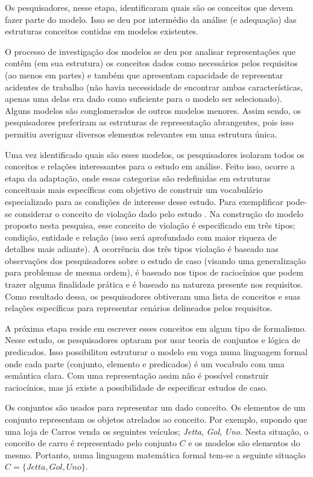 Os pesquisadores, nesse etapa, identificaram quais são os conceitos que devem fazer parte do modelo. Isso se deu por intermédio da análise (e adequação) das estruturas conceitos contidas em modelos existentes.  

O processo de investigação dos modelos se deu por analisar representações que contêm (em sua estrutura) os conceitos dados como necessários pelos requisitos (ao menos em partes) e também que apresentam capacidade de representar acidentes de trabalho (não havia necessidade de encontrar ambas características, apenas uma delas era dado como suficiente para o modelo ser selecionado). Alguns modelos são conglomerados de outros modelos menores. Assim sendo, os pesquisadores preferiram as estruturas de representação abrangentes, pois isso permitiu averiguar diversos elementos relevantes em uma estrutura única.  

Uma vez identificado quais são esses modelos, os pesquisadores isolaram todos os conceitos e relações interessantes para o estudo em análise. Feito isso, ocorre a etapa da adaptação, onde essas categorias são redefinidas em estruturas conceituais mais específicas com objetivo de construir um vocabulário especializado para as condições de interesse desse estudo. Para exemplificar pode-se considerar o conceito de violação dado pelo estudo \cite{dastaniframework}. Na construção do modelo proposto nesta pesquisa, esse conceito de violação é especificado em três tipos; condição, entidade e relação (isso será aprofundado com maior riqueza de detalhes mais adiante). A ocorrência dos três tipos violação é baseado nas observações dos pesquisadores sobre o estudo de caso (visando uma generalização para problemas de mesma ordem), é baseado nos tipos de raciocínios que podem trazer alguma finalidade prática e é baseado na natureza presente nos requisitos. Como resultado dessa, os pesquisadores obtiveram uma lista de conceitos e suas relações específicas para representar cenários delineados pelos requisitos. 


A próxima etapa reside em escrever esses conceitos em algum tipo de formalismo. Nesse estudo, os pesquisadores optaram por usar teoria de conjuntos e lógica de predicados. Isso possibilitou estruturar o modelo em voga numa linguagem formal onde cada parte (conjunto, elemento e predicados) é um vocabulo com uma semântica clara. Com uma representação assim não é possível construir raciocínios, mas já existe a possibilidade de especificar estudos de caso. 

Os conjuntos são usados para representar um dado conceito. Os elementos de um conjunto representam os objetos atrelados ao 
conceito. Por exemplo, supondo que uma loja de Carros venda os seguintes veículos; \textit{Jetta}, \textit{Gol}, \textit{Uno}.
Nesta situação, o conceito de carro é representado pelo conjunto $C$ e os modelos são elementos do mesmo. Portanto, numa linguagem
matemática formal tem-se a seguinte situação $C = \{Jetta,Gol,Uno\}$. 

